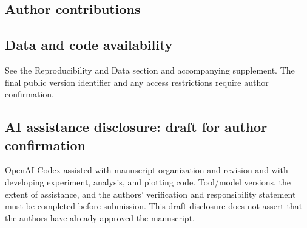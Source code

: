 \documentclass[11pt,a4paper]{article}
\begin{document}
\subsection*{Author contributions}
\textit{} \underline{\hspace{5cm}}
\subsection*{Data and code availability}
See the Reproducibility and Data section and accompanying supplement.
The final public version identifier and any access restrictions require author confirmation.
\subsection*{AI assistance disclosure: draft for author confirmation}
OpenAI Codex assisted with manuscript organization and revision and with developing
experiment, analysis, and plotting code. Tool/model versions, the extent of assistance,
and the authors' verification and responsibility statement must be completed before submission.
This draft disclosure does not assert that the authors have already approved the manuscript.
\end{document}
